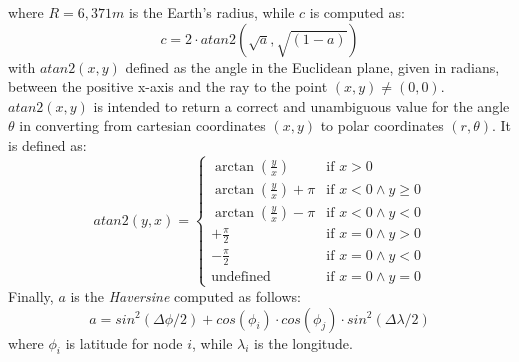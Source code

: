 where \(R = 6,371m\) is the Earth's radius, while \(c\) is computed as:
\begin{equation}
c = 2\cdot atan2(\sqrt{a},\sqrt{(1-a)})
\end{equation}
with \(atan2(x,y)\) defined as the angle in the Euclidean plane, given in radians, between the positive x-axis and the ray to the point \((x,y)\neq(0,0)\). \(atan2(x,y)\) is intended to return a correct and unambiguous value for the angle \(\theta\) in converting from cartesian coordinates \((x,y)\) to polar coordinates \((r,\theta)\). It is defined as:
\begin{equation}
{atan2} (y,x)={\begin{cases}\arctan({\frac {y}{x}})&{\text{if }}x>0\\\arctan({\frac {y}{x}})+\pi &{\text{if  }}x<0\wedge y\geq 0\\\arctan({\frac {y}{x}})-\pi &{\text{if  }}x<0\wedge y<0\\+{\frac {\pi }{2}}&{\text{if }}x=0\wedge y>0\\-{\frac {\pi }{2}}&{\text{if  }}x=0\wedge y<0\\{\text{undefined}}&{\text{if  }}x=0\wedge y=0\end{cases}}
\end{equation}
Finally, \(a\) is the \textit{Haversine} computed as follows:
\begin{equation}
a = sin^2(\Delta \phi/2) + cos(\phi_i)\cdot cos(\phi_j ) \cdot sin^2(\Delta\lambda/2)
\end{equation}
where \(\phi_i\) is latitude for node \(i\), while \(\lambda_i\) is the longitude.

